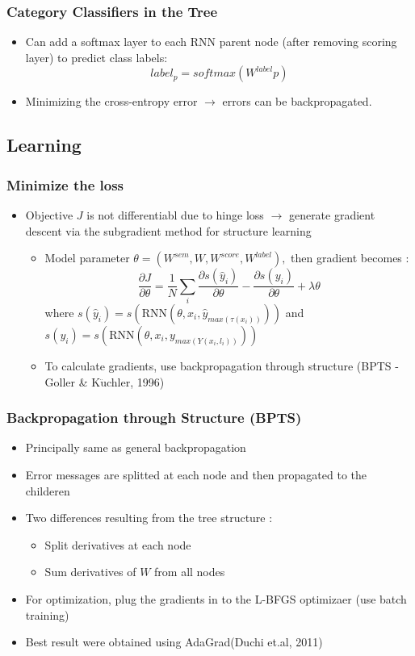 \documentclass{beamer}
\begin{document}
\frame
{
	\frametitle{Category Classifiers in the Tree}
	\begin{itemize}
		\item Can add a softmax layer to each RNN parent node (after removing scoring layer) to predict class labels:
		$$ label_p = softmax(W^{label}p) $$ 
		\item Minimizing the cross-entropy error $\rightarrow$ errors can be backpropagated.
	\end{itemize}
}
\subsection{Learning}
\frame
{
	\frametitle{Minimize the loss}
	\begin{itemize}
		\item Objective $J$ is not differentiabl due to hinge loss $\rightarrow$
		generate gradient descent via the subgradient method for structure learning
		\begin{itemize}
			\item Model parameter $\theta = (W^{sem}, W, W^{score}, W^{label}), $ then gradient becomes : 
			$$ \frac{\partial J}{\partial \theta} = \frac{1}{N} \sum_i \frac{\partial s(\hat{y}_i)}{\partial \theta} 
			- \frac{\partial s(y_i)}{\partial \theta} + 	\lambda \theta $$ where $s(\hat{y}_i) = s(\text{RNN}(\theta, x_i, \hat{y}_{max (\tau(x_i))})) $ and
			$ s(y_i) = s(\text{RNN}(\theta, x_i, y_{max(Y(x_i, l_i))})) $
			\item To calculate gradients, use backpropagation through structure (BPTS - Goller \& K$\ddot{\text{u}}$chler, 1996)
		\end{itemize}		
	\end{itemize}
}
\frame
{
	\frametitle{Backpropagation through Structure (BPTS)}
	\begin{itemize}
		\item Principally same as general backpropagation
		\item Error messages are splitted at each node and then propagated to the childeren
		\item Two differences resulting from the tree structure : 
		\begin{itemize}
			\item Split derivatives at each node
			\item Sum derivatives of $W$ from all nodes
		\end{itemize}
		\item For optimization, plug the gradients in to the L-BFGS optimizaer (use batch training)
		\item Best result were obtained using AdaGrad(Duchi et.al, 2011)
	\end{itemize}
}
\end{document}
